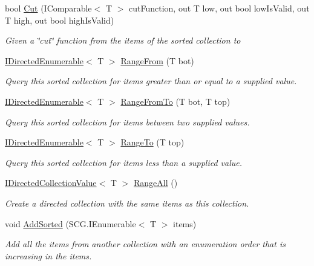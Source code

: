 \begin{DoxyCompactItemize}
bool \hyperlink{interface_c5_1_1_i_sorted_a7acdf0ef5765c2554e5efa8df856c2b4}{Cut} (I\+Comparable$<$ T $>$ cut\+Function, out T low, out bool low\+Is\+Valid, out T high, out bool high\+Is\+Valid)
\begin{DoxyCompactList}\small\item\em Given a \char`\"{}cut\char`\"{} function from the items of the sorted collection to \end{DoxyCompactList}\item 
\hyperlink{interface_c5_1_1_i_directed_enumerable}{I\+Directed\+Enumerable}$<$ T $>$ \hyperlink{interface_c5_1_1_i_sorted_a0eabf2b7418467cf0ee1cfb15b6b9e34}{Range\+From} (T bot)
\begin{DoxyCompactList}\small\item\em Query this sorted collection for items greater than or equal to a supplied value. \end{DoxyCompactList}\item 
\hyperlink{interface_c5_1_1_i_directed_enumerable}{I\+Directed\+Enumerable}$<$ T $>$ \hyperlink{interface_c5_1_1_i_sorted_a66a3e2a57ca820b3a67b2f8d99e3c7cb}{Range\+From\+To} (T bot, T top)
\begin{DoxyCompactList}\small\item\em Query this sorted collection for items between two supplied values. \end{DoxyCompactList}\item 
\hyperlink{interface_c5_1_1_i_directed_enumerable}{I\+Directed\+Enumerable}$<$ T $>$ \hyperlink{interface_c5_1_1_i_sorted_a438ee04db17957587e7651f4c010814a}{Range\+To} (T top)
\begin{DoxyCompactList}\small\item\em Query this sorted collection for items less than a supplied value. \end{DoxyCompactList}\item 
\hyperlink{interface_c5_1_1_i_directed_collection_value}{I\+Directed\+Collection\+Value}$<$ T $>$ \hyperlink{interface_c5_1_1_i_sorted_ad90021b06a8976cc8c043104cf8e1ca4}{Range\+All} ()
\begin{DoxyCompactList}\small\item\em Create a directed collection with the same items as this collection. \end{DoxyCompactList}\item 
void \hyperlink{interface_c5_1_1_i_sorted_a51dd21143c9438dc9f841a9d7b6f6b3f}{Add\+Sorted} (S\+C\+G.\+I\+Enumerable$<$ T $>$ items)
\begin{DoxyCompactList}\small\item\em Add all the items from another collection with an enumeration order that is increasing in the items. \end{DoxyCompactList}\item 

\end{DoxyCompactItemize}
